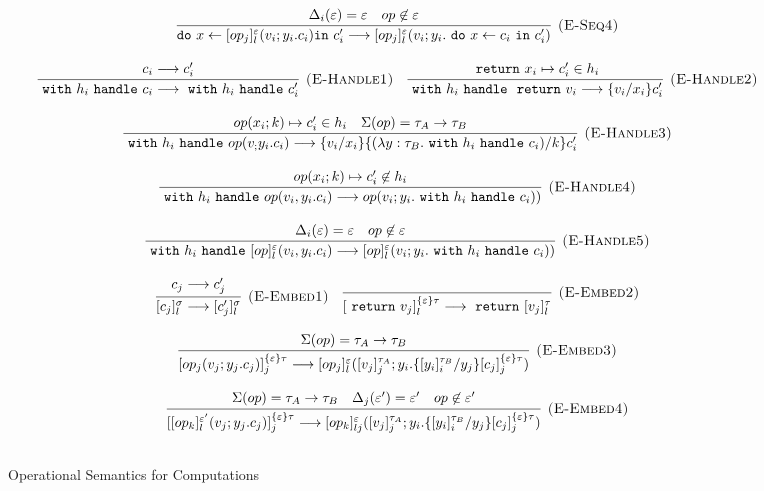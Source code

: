 \begin{figure}[p]
{\[\begin{array}{c}
\infer[\textsc{(E-Seq4)}]
  {\texttt{do}\ x \leftarrow [op_j]^\varepsilon_l(v_i; y_i.c_i) \texttt{in}\ c_i' \longrightarrow [op_j]^\varepsilon_l(v_i; y_i. \m{do} x \leftarrow c_i \m{in} c_i')}
  {\Delta_i(\varepsilon) = \varepsilon & op \not \in \varepsilon} \\[3ex]
  

  
 \infer[\textsc{(E-Handle1)}]
  {\m{with} h_i \m{handle} c_i \longrightarrow \m{with} h_i \m{handle} c_i' }
  {c_i \longrightarrow c_i'} \quad
  
\infer[\textsc{(E-Handle2)}]
  {\m{with} h_i \m{handle} \m{return} v_i \longrightarrow \{v_i/x_i\}c_i' }
  {\m{return} x_i \mapsto	c_i' \in h_i} \\[3ex]
  
\infer[\textsc{(E-Handle3)}]
  {\m{with} h_i \m{handle} op(v_; y_i.c_i) \longrightarrow \{v_i/x_i\} \{(\lambda y: \tau_B.
   \m{with} h_i\m{handle} c_i) / k\}c_i' }
  {op(x_i; k) \mapsto c_i' \in h_i & \Sigma(op) = \tau_A \rightarrow \tau_B} \\[3ex]
 
 
\infer[\textsc{(E-Handle4)}]
  {\m{with} h_i \m{handle} op(v_i, y_i.c_i) \longrightarrow op(v_i; y_i. \m{with} h_i \m{handle} c_i))}
  {op(x_i; k) \mapsto c_i' \not\in h_i } \\[3ex]
  
\infer[\textsc{(E-Handle5)}]
  {\m{with} h_i \m{handle} [op]^\varepsilon_l(v_i, y_i.c_i) \longrightarrow [op]^\varepsilon_l(v_i; y_i. \m{with} h_i \m{handle} c_i))}
  {\Delta_i(\varepsilon) = \varepsilon & op \not \in \varepsilon} \\[3ex]
  
\infer[\textsc{(E-Embed1)}]
{[c_j]^\sigma_l \longrightarrow [c_j']^\sigma_l}
{c_j \longrightarrow c_j'} \quad 



\infer[\textsc{(E-Embed2)}]
{[\m{return} v_j]^{\{\varepsilon\}\tau}_l \longrightarrow \m{return} [v_j]^\tau_l}
{} \\[3ex]

\infer[\textsc{(E-Embed3)}]
{[op_j(v_j; y_j.c_j)]^{\{\varepsilon\}\tau}_j \longrightarrow [op_j]^\varepsilon_l([v_j]^{\tau_A}_j; y_i. \{[y_i]^{\tau_B}_i / y_j\}[c_j]^{\{\varepsilon\}\tau}_j)}
{ \Sigma(op) = \tau_A \rightarrow \tau_B} \\[3ex]

\infer[\textsc{(E-Embed4)}]
{[[op_k]^{\varepsilon'}_{l}(v_j; y_j.c_j)]^{\{\varepsilon\}\tau}_j \longrightarrow [op_k]^\varepsilon_{lj}([v_j]^{\tau_A}_j; y_i. \{[y_i]^{\tau_B}_i / y_j\}[c_j]^{\{\varepsilon\}\tau}_j)}
{ \Sigma(op) = \tau_A \rightarrow \tau_B& \Delta_j(\varepsilon') = \varepsilon' & op \not \in \varepsilon'} \\[3ex]



\end{array}
\]

}
\caption{Operational Semantics for Computations}
\label{fig-op2}

\end{figure}

